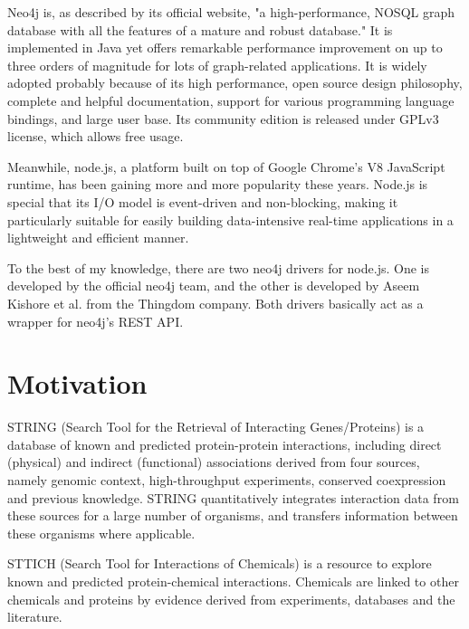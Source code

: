 \documentclass[10pt,conference,compsocconf]{../IEEEtran}
\begin{document}
Neo4j is, as described by its official website, "a high-performance, NOSQL graph database with all the features of a mature and robust database." It is implemented in Java yet offers remarkable performance improvement on up to three orders of magnitude for lots of graph-related applications. It is widely adopted probably because of its high performance, open source design philosophy, complete and helpful documentation, support for various programming language bindings, and large user base. Its community edition is released under GPLv3 license, which allows free usage.


Meanwhile, node.js, a platform built on top of Google Chrome's V8 JavaScript runtime, has been gaining more and more popularity these years. Node.js is special that its I/O model is event-driven and non-blocking, making it particularly suitable for easily building data-intensive real-time applications in a lightweight and efficient manner. 

To the best of my knowledge, there are two neo4j drivers for node.js. One is developed by the official neo4j team, and the other is developed by Aseem Kishore et al. from the Thingdom company. Both drivers basically act as a wrapper for neo4j's REST API.

\section{Motivation}

STRING (Search Tool for the Retrieval of Interacting Genes/Proteins) \citep{1070,1071,1072,1073,1074,1075} is a database of known and predicted protein-protein interactions, including direct (physical) and indirect (functional) associations derived from four sources, namely genomic context, high-throughput experiments, conserved coexpression and previous knowledge. STRING quantitatively integrates interaction data from these sources for a large number of organisms, and transfers information between these organisms where applicable.

STTICH (Search Tool for Interactions of Chemicals) \citep{1068,1069,1101} is a resource to explore known and predicted protein-chemical interactions. Chemicals are linked to other chemicals and proteins by evidence derived from experiments, databases and the literature.
\end{document}
